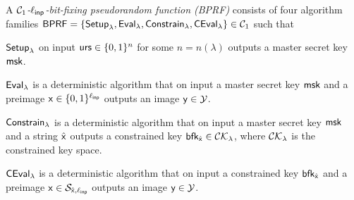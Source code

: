 \begin{definition}
\label{bfprf}
A \emph{$\mathcal{C}_1$-$\ell_{\mathsf{inp}}$-bit-fixing pseudorandom function (BPRF)} consists of four algorithm families $\mathsf{BPRF} = \{\mathsf{Setup}_{\lambda}, \mathsf{Eval}_{\lambda}, \mathsf{Constrain}_{\lambda}, \mathsf{CEval}_{\lambda} \} \in \mathcal{C}_1$ such that
\begin{compactitem}
	\item $\mathsf{Setup}_{\lambda}$ on input $\mathsf{urs} \in \{0, 1\}^n$ for some $n = n(\lambda)$ outputs a master secret key $\mathsf{msk}$.
	\item $\mathsf{Eval}_{\lambda}$ is a deterministic algorithm that on input a master secret key $\mathsf{msk}$ and a preimage $\mathsf{x} \in \{0,1\}^{\ell_{\mathsf{inp}}}$ outputs an image $\mathsf{y} \in \mathcal{Y}$.
	\item $\mathsf{Constrain}_{\lambda}$ is a deterministic algorithm that on input a master secret key $\mathsf{msk}$ and a string $\hat{\mathsf{x}}$ outputs a constrained key $\mathsf{bfk}_{\hat{\mathsf{x}}} \in \mathcal{CK}_{\lambda}$, where $\mathcal{CK}_{\lambda}$ is the constrained key space.
	\item $\mathsf{CEval}_{\lambda}$ is a deterministic algorithm that on input a constrained key $\mathsf{bfk}_{\hat{\mathsf{x}}}$ and a preimage $\mathsf{x} \in \mathcal{S}_{\hat{\mathsf{x}},\ell_{\mathsf{inp}}}$ outputs an image $\mathsf{y} \in \mathcal{Y}$.
\end{compactitem}




\end{definition}
